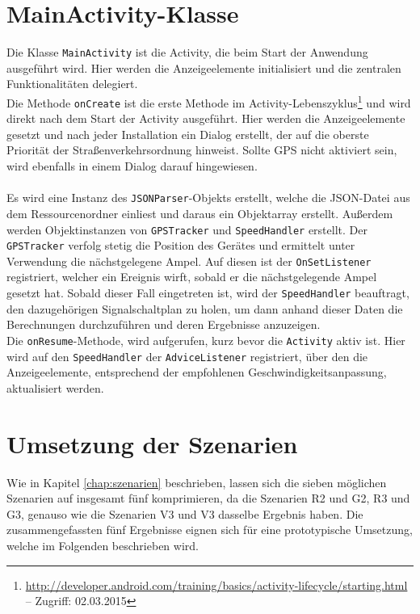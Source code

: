 \section{MainActivity-Klasse}
Die Klasse \texttt{MainActivity} ist die \gls{Activity}, die beim Start der Anwendung ausgeführt wird.  Hier werden die Anzeigeelemente initialisiert und die zentralen Funktionalitäten delegiert.\\
Die Methode \texttt{onCreate} ist die erste Methode im \gls{Activity}-Lebenszyklus\footnote{ \url{http://developer.android.com/training/basics/activity-lifecycle/starting.html} -- Zugriff: 02.03.2015} und wird direkt nach dem Start der \gls{Activity} ausgeführt. Hier werden die Anzeigeelemente gesetzt und nach jeder Installation ein Dialog erstellt, der auf die oberste Priorität der Straßenverkehrsordnung hinweist. Sollte \gls{GPS} nicht aktiviert sein, wird ebenfalls in einem Dialog darauf hingewiesen.\\\\
Es wird eine Instanz des \texttt{JSONParser}-Objekts erstellt, welche die \gls{JSON}-Datei aus dem Ressourcenordner einliest und daraus ein Objektarray erstellt. Außerdem werden Objektinstanzen von \texttt{GPSTracker} und \texttt{SpeedHandler} erstellt. Der \texttt{GPSTracker} verfolg stetig die Position des Gerätes und ermittelt unter Verwendung die nächstgelegene Ampel. Auf diesen ist der \texttt{OnSetListener} registriert, welcher ein Ereignis wirft, sobald er die nächstgelegende Ampel gesetzt hat. Sobald dieser Fall eingetreten ist, wird der \texttt{SpeedHandler} beauftragt, den dazugehörigen Signalschaltplan zu holen, um dann anhand dieser Daten die Berechnungen durchzuführen und deren Ergebnisse anzuzeigen.\\
Die \texttt{onResume}-Methode, wird aufgerufen, kurz bevor die \texttt{Activity} aktiv ist. Hier wird auf den \texttt{SpeedHandler} der \texttt{AdviceListener} registriert, über den die Anzeigeelemente, entsprechend der empfohlenen Geschwindigkeitsanpassung, aktualisiert werden. 
%
%
\section{Umsetzung der Szenarien}
Wie in Kapitel \ref{chap:szenarien} beschrieben, lassen sich die sieben möglichen Szenarien auf insgesamt fünf komprimieren, da die Szenarien R2 und G2, R3 und G3, genauso wie die Szenarien V3 und V3 dasselbe Ergebnis haben. Die zusammengefassten fünf Ergebnisse eignen sich für eine prototypische Umsetzung, welche im Folgenden beschrieben wird.
%
%
